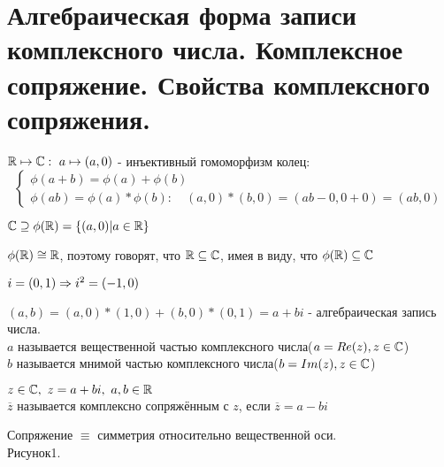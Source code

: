 \section{Алгебраическая форма записи комплексного числа. Комплексное сопряжение.
Свойства комплексного сопряжения.}

$\mathbb{R} \mapsto \mathbb{C}:~a \mapsto (a, 0)$ - инъективный гомоморфизм колец: \\
$$
\begin{cases}
	\phi(a+b) = \phi(a) + \phi(b) \\
	\phi(ab) = \phi(a) * \phi(b):\quad(a, 0)*(b, 0) = (ab - 0, 0 + 0) = (ab, 0)
\end{cases}
$$

$\mathbb{C} \supseteq \phi(\mathbb{R}) = \{(a, 0) | a \in \mathbb{R}\}$

$\phi(\mathbb{R}) \cong \mathbb{R}$, поэтому говорят, что $\mathbb{R} \subseteq \mathbb{C}$, имея в виду, что $\phi(\mathbb{R}) \subseteq \mathbb{C}$

$i = (0, 1) \Rightarrow i^2 = (-1, 0)$
\begin{Def}
	$(a, b) = (a, 0)*(1, 0) + (b, 0)*(0, 1) = a + bi$ - алгебраическая запись числа.\\
	\hspace*{1cm}$a$ называется вещественной частью комплексного числа($a = Re(z), z \in \mathbb{C}$) \\
	\hspace*{1cm}$b$ называется мнимой частью комплексного числа($b = Im(z), z \in \mathbb{C}$) 
\end{Def}  

\begin{Def}
	$z \in \mathbb{C},~z = a + bi,~a, b \in \mathbb{R}$ \\
	\hspace*{1cm} $\overline{z}$ называется комплексно сопряжённым с $z$, если $\overline{z} = a - bi$ 
\end{Def}
\begin{Rem}
	Сопряжение $\equiv$ симметрия относительно вещественной оси. \\
	Рисунок1.
\end{Rem}

